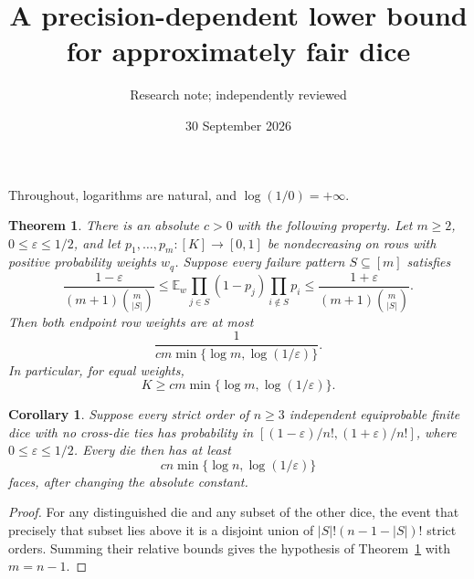 \documentclass[11pt]{article}
\title{A precision-dependent lower bound for approximately fair dice}
\author{Research note; independently reviewed}
\date{30 September 2026}
\newtheorem{theorem}{Theorem}
\newtheorem{corollary}{Corollary}
\newcommand{\E}{\mathbb E}
\begin{document}
\maketitle
Throughout, logarithms are natural, and $\log(1/0)=+\infty$.

\begin{theorem}\label{main}
There is an absolute $c>0$ with the following property. Let $m\ge2$,
$0\le\varepsilon\le1/2$, and let $p_1,\ldots,p_m:[K]\to[0,1]$ be
nondecreasing on rows with positive probability weights $w_q$.
Suppose every failure pattern $S\subseteq[m]$ satisfies
\[
 \frac{1-\varepsilon}{(m+1)\binom m{|S|}}
 \le\E_w\prod_{j\in S}(1-p_j)\prod_{i\notin S}p_i
 \le\frac{1+\varepsilon}{(m+1)\binom m{|S|}}.
\]
Then both endpoint row weights are at most
\[
 \frac1{c m\min\{\log m,\log(1/\varepsilon)\}}.
\]
In particular, for equal weights,
\[
 K\ge c m\min\{\log m,\log(1/\varepsilon)\}.
\]
\end{theorem}

\begin{corollary}
Suppose every strict order of $n\ge3$ independent equiprobable finite
dice with no cross-die ties has probability in $[(1-\varepsilon)/n!,(1+\varepsilon)/n!]$,
where $0\le\varepsilon\le1/2$. Every die then has at least
\[
 c n\min\{\log n,\log(1/\varepsilon)\}
\]
faces, after changing the absolute constant.
\end{corollary}
\begin{proof}
For any distinguished die and any subset of the other dice, the event
that precisely that subset lies above it is a disjoint union of
$|S|!(n-1-|S|)!$ strict orders. Summing their relative bounds gives
the hypothesis of Theorem~\ref{main} with $m=n-1$.
\end{proof}
\end{document}
